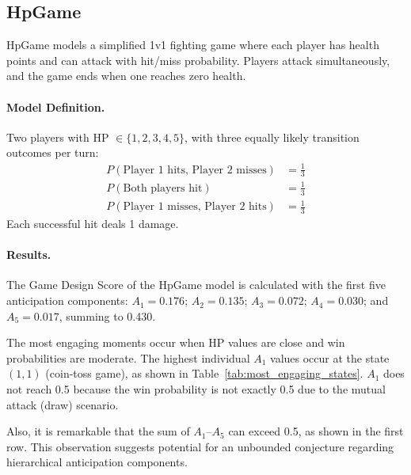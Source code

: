\documentclass[manuscript,review,anonymous]{acmart}
\theoremstyle{definition}
\theoremstyle{plain}
\begin{document}
\subsection{HpGame}
HpGame models a simplified 1v1 fighting game where each player has health points and can attack with hit/miss probability.
Players attack simultaneously, and the game ends when one reaches zero health.

\paragraph{Model Definition.}
Two players with HP $\in \{1,2,3,4,5\}$, with three equally likely transition outcomes per turn:
\begin{align}
  P(\text{Player 1 hits, Player 2 misses}) &= \frac{1}{3} \\
  P(\text{Both players hit}) &= \frac{1}{3} \\
  P(\text{Player 1 misses, Player 2 hits}) &= \frac{1}{3}
\end{align}
Each successful hit deals 1 damage.

\paragraph{Results.}
The Game Design Score of the HpGame model is calculated with the first five anticipation components: $A_1 = 0.176$; $A_2 = 0.135$; $A_3 = 0.072$; $A_4 = 0.030$; and $A_5 = 0.017$, summing to 0.430.

The most engaging moments occur when HP values are close and win probabilities are moderate.
The highest individual $A_1$ values occur at the state $(1, 1)$ (coin-toss game), as shown in Table~\ref{tab:most_engaging_states}.
$A_1$ does not reach 0.5 because the win probability is not exactly 0.5 due to the mutual attack (draw) scenario.

Also, it is remarkable that the sum of $A_1$--$A_5$ can exceed 0.5, as shown in the first row. This observation suggests potential for an unbounded conjecture regarding hierarchical anticipation components.
\end{document}
